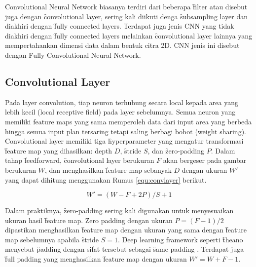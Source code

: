 \f{Convolutional Neural Network} biasanya terdiri dari beberapa \f{filter} atau disebut juga dengan \f{convolutional layer}, sering kali diikuti denga \f{subsampling layer} dan diakhiri dengan \f{fully connected layers}. Terdapat juga jenis CNN yang tidak diakhiri dengan \f{fully connected layers} melainkan \f{convolutional layer} lainnya yang mempertahankan dimensi data dalam bentuk citra 2D. CNN jenis ini disebut dengan \f{Fully Convolutional Neural Network}.

\subsection{Convolutional Layer}
Pada layer convolution, tiap neuron terhubung secara local kepada area yang lebih kecil (local receptive field) pada layer sebelumnya. Semua neuron yang memiliki feature maps yang sama memperoleh data dari input area yang berbeda hingga semua input plan tersaring tetapi saling berbagi bobot (weight sharing).\\

\f{Convolutional layer} memiliki tiga \f{hyperparameter} yang mengatur transformasi \f{feature map} yang dihasilkan: \f{depth} $D$, \f{stride} $S$, dan \f{zero-padding} $P$. Dalam tahap \f{feedforward}, \f{convolutional layer} berukuran $F$ akan bergeser pada gambar berukuran $W$, dan menghasilkan \f{feature map} sebanyak $D$ dengan ukuran $W'$ yang dapat dihitung menggunakan Rumus \ref{equ:convlayer} berikut.

\begin{equation}
\label{equ:convlayer}
W' = (W - F + 2P) / S + 1
\end{equation}

Dalam praktiknya, \f{zero-padding} sering kali digunakan untuk menyesuaikan ukuran hasil \f{feature map}. \f{Zero padding} dengan ukuran $P = (F - 1)/2$ dipastikan menghasilkan \f{feature map} dengan ukuran yang sama dengan \f{feature map} sebelumnya apabila \f{stride} $S = 1$. \f{Deep learning framework} seperti \f{theano} menyebut \f{padding} dengan sifat tersebut sebagai \f{same padding} . Terdapat juga \f{full padding} yang menghasilkan \f{feature map} dengan ukuran $W' = W + F - 1$.

